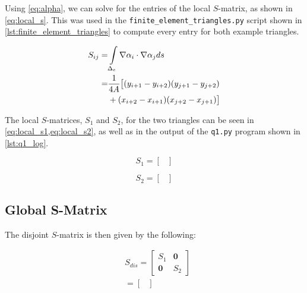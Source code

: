 \documentclass[a4paper,titlepage]{article}
\newcommand{\code}[1]{\texttt{#1}}
\begin{document}
	Using \cref{eq:alpha}, we can solve for the entries of the local $S$-matrix, as shown in \cref{eq:local_s}. This was used in the \code{finite_element_triangles.py} script shown in \cref{lst:finite_element_triangles} to compute every entry for both example triangles.
	
	\begin{equation} \label{eq:local_s}
		\begin{split}
			S_{ij} 
			= &\int\displaylimits_{\Delta_e}\nabla\alpha_i\cdot\nabla\alpha_j ds \\
			= &\frac{1}{4A} \big[ (y_{i+1} - y_{i+2})(y_{j+1} - y_{j+2}) \\
			&+ (x_{i+2} - x_{i+1})(x_{j+2} - x_{j+1})
			\big]
		\end{split}
	\end{equation}
	
	The local $S$-matrices, $S_1$ and $S_2$, for the two triangles can be seen in \cref{eq:local_s1,eq:local_s2}, as well as in the output of the \code{q1.py} program shown in \cref{lst:q1_log}.
	
	\begin{equation} \label{eq:local_s1}
		S_1 =
			\begin{bmatrix}
				
			\end{bmatrix}
	\end{equation}
	
	\begin{equation} \label{eq:local_s2}
		S_2 =
			\begin{bmatrix}
				
			\end{bmatrix}
	\end{equation}
	
	\subsection{Global S-Matrix}
	
	The disjoint $S$-matrix is then given by the following:

	\begin{equation*}
		\begin{split}
			&S_{dis} = \begin{bmatrix}
				S_1 & \textbf{0} \\
				\textbf{0} & S_2
			  \end{bmatrix} \\
			&= \begin{bmatrix}
			
			\end{bmatrix}
		\end{split}
	\end{equation*}
	
\end{document}
